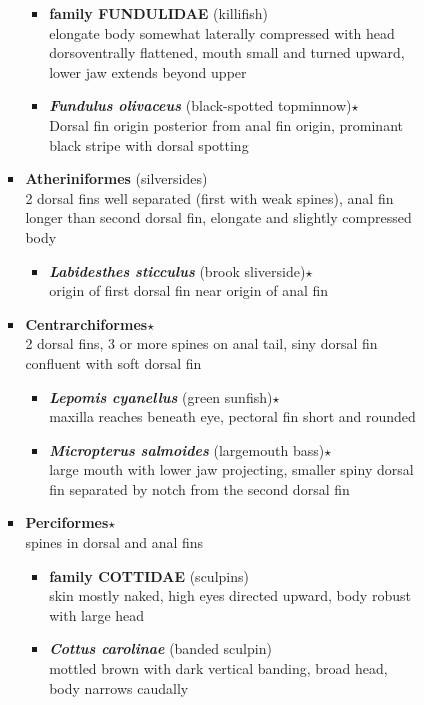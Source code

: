 \documentclass[a4paper,12pt]{article}
\begin{document}
\begin{description}
\begin{itemize}
\begin{itemize}
\begin{itemize}
\begin{itemize}
        \item{\textbf{family FUNDULIDAE} (killifish)} \\ elongate body somewhat laterally compressed with head dorsoventrally flattened, mouth small and turned upward, lower jaw extends beyond upper
        \item{\textbf{\textit{   Fundulus olivaceus}} (black-spotted topminnow)$\star$} \\ Dorsal fin origin posterior from anal fin origin, prominant black stripe with dorsal spotting
      \end{itemize}
      \item{\textbf{Atheriniformes} (silversides)} \\ 2 dorsal fins well separated (first with weak spines), anal fin longer than second dorsal fin, elongate and slightly compressed body
      \begin{itemize}
        \item{\textbf{\textit{   Labidesthes sticculus}} (brook sliverside)$\star$} \\ origin of first dorsal fin near origin of anal fin
      \end{itemize}
      \item{\textbf{Centrarchiformes}$\star$} \\ 2 dorsal fins, 3 or more spines on anal tail, siny dorsal fin confluent with soft dorsal fin
      \begin{itemize}
        \item{\textbf{\textit{   Lepomis cyanellus}} (green sunfish)$\star$} \\ maxilla reaches beneath eye, pectoral fin short and rounded
        \item{\textbf{\textit{   Micropterus salmoides}} (largemouth bass)$\star$} \\ large mouth with lower jaw projecting, smaller spiny dorsal fin separated by notch from the second dorsal fin
      \end{itemize}
      \item{\textbf{Perciformes}$\star$} \\ spines in dorsal and anal fins
      \begin{itemize}
        \item{\textbf{family COTTIDAE} (sculpins)} \\ skin mostly naked, high eyes directed upward, body robust with large head
        \item{\textbf{\textit{   Cottus carolinae}} (banded sculpin)} \\ mottled brown with dark vertical banding, broad head, body narrows caudally

\end{itemize}
\end{itemize}
\end{itemize}
\end{itemize}
\end{description}
\end{document}
